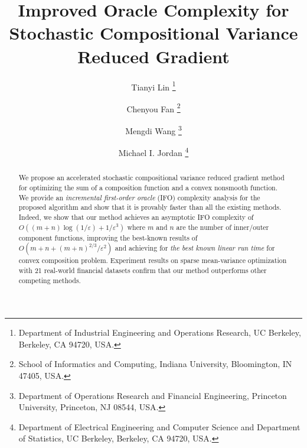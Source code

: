 \documentclass[11pt]{article}
\title{Improved Oracle Complexity for Stochastic Compositional Variance Reduced Gradient}
\author{
Tianyi Lin
\thanks{Department of Industrial Engineering and Operations Research, UC Berkeley, Berkeley, CA 94720, USA.}
\and
Chenyou Fan
\thanks{School of Informatics and Computing, Indiana University, Bloomington, IN 47405, USA.} 
\and
Mengdi Wang
\thanks{Department of Operations Research and Financial Engineering, Princeton University, Princeton, NJ 08544, USA.}
\and 
Michael I. Jordan
\thanks{Department of Electrical Engineering and Computer Science and Department of Statistics, UC Berkeley, Berkeley, CA 94720, USA.}
}
\begin{document}
\maketitle

\begin{abstract}
We propose an accelerated stochastic compositional variance reduced gradient method for optimizing the sum of a composition function and a convex nonsmooth function. We provide an \textit{incremental first-order oracle} (IFO) complexity analysis for the proposed algorithm and show that it is provably faster than all the existing methods. Indeed, we show that our method achieves an asymptotic IFO complexity of $O\left((m+n)\log\left(1/\varepsilon\right)+1/\varepsilon^3\right)$ where $m$ and $n$ are the number of inner/outer component functions, improving the best-known results of $O\left(m+n+(m+n)^{2/3}/\varepsilon^2\right)$ and achieving for \textit{the best known linear run time} for convex composition problem. Experiment results on sparse mean-variance optimization with 21 real-world financial datasets confirm that our method outperforms other competing methods.
\end{abstract}

\vspace{0.25cm}
\end{document}
